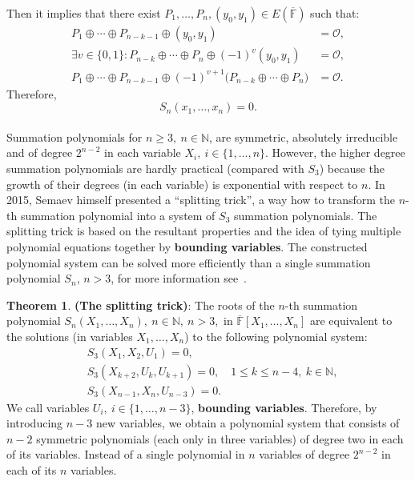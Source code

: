 \documentclass[thesis=M,english]{FITthesis}[2012/10/20]
\theoremstyle{remark}
\theoremstyle{definition}
\newtheorem{theorem}{Theorem}[section]
\begin{document}
Then it implies that there exist $P_1,\ldots,P_n, (y_0, y_1) \in E(\overline{\mathbb{F}})$ such that:
\begin{align*}
P_1 \oplus \cdots \oplus P_{n-k-1} \oplus (y_0,y_1) &= \mathcal{O}, \\
\exists v \in \{0,1\}: P_{n-k} \oplus \cdots \oplus P_{n} \oplus (-1)^{v}(y_0,y_1) &= \mathcal{O}, \\
P_1 \oplus \cdots \oplus P_{n-k-1} \oplus (-1)^{v+1}\bigg(P_{n-k} \oplus \cdots \oplus P_{n}\bigg) &= \mathcal{O}.
\end{align*}
Therefore, 
$$
S_n(x_1,\ldots,x_n) = 0.
$$
\\
\noindent Summation polynomials for $n \geq 3,\ n \in \mathbb{N}$, are symmetric, absolutely irreducible and of degree $2^{n-2}$ in each variable $X_i,\ i \in \{1,\ldots,n\}$.
However, the higher degree summation polynomials are hardly practical (compared with $S_3$) because the growth of their degrees (in each variable) is exponential with respect to $n$. In 2015, Semaev himself presented a \enquote{splitting trick}, a way how to transform the $n$-th summation polynomial into a  system of $S_3$ summation polynomials. The splitting trick is based on the resultant properties and the idea of tying multiple polynomial equations together by \textbf{bounding variables}. The constructed polynomial system can be solved more efficiently than a single summation polynomial $S_n$, $n > 3$, for more information see~\cite{semaev15}. 
\begin{theorem}\textbf{(The splitting trick)}: The roots of the $n$-th summation polynomial $S_n(X_1,\ldots,X_n),\ n \in \mathbb{N},\ n > 3,$ in $\overline{\mathbb{F}}[X_1,\ldots,X_n]$ are equivalent to the solutions (in variables $X_1,\ldots,X_n$) to the following polynomial system:
\begin{align*}
&S_3(X_1,X_2,U_1) = 0, \\
&S_3(X_{k+2}, U_{k}, U_{k+1}) = 0, \quad 1 \leq k \leq n-4,\ k \in \mathbb{N}, \\
&S_3(X_{n-1}, X_n, U_{n-3}) = 0.
\end{align*} 
We call variables $U_i,\ i \in \{1, \ldots, n - 3\}$, \textbf{bounding variables}. Therefore, by introducing $n-3$ new variables, we obtain a polynomial system that consists of $n-2$ symmetric polynomials (each only in three variables) of degree two in each of its variables. Instead of a single polynomial in $n$ variables of degree $2^{n-2}$ in each of its $n$ variables.
\end{theorem}
\end{document}
